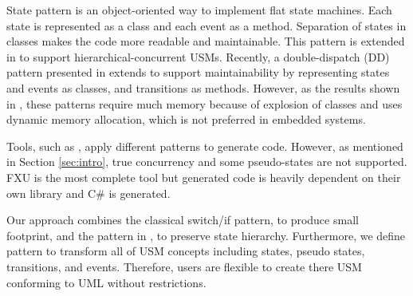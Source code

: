 State pattern \cite{Shalyto2006,Douglass1999} is an object-oriented way to implement flat state machines. Each state is represented as a class and each event as a method. %
Separation of states in classes makes the code more readable and maintainable. %
This pattern is extended in \cite{niaz_mapping_2004} to support hierarchical-concurrent USMs. 
Recently, a double-dispatch (DD) pattern presented in \cite{spinke_object-oriented_2013} extends \cite{niaz_mapping_2004} to support maintainability by %
representing states and events as classes, and transitions as methods. 
However, as the results shown in \cite{spinke_object-oriented_2013}, these patterns require much memory because of explosion of classes and uses dynamic memory allocation, which is not preferred in embedded systems.

Tools, such as \cite{ibm_rhapsody, sparxsystems_enterprise_2014}, apply different patterns to generate code. 
However, as mentioned in Section \ref{sec:intro}, true concurrency and some pseudo-states are not supported. 
FXU \cite{Pilitowski2007} is the most complete tool but generated code is heavily dependent on their own library and C\# is generated.

Our approach combines the classical switch/if pattern, to produce small footprint, and the pattern in \cite{niaz_mapping_2004}, to preserve state hierarchy.
Furthermore, we define pattern to transform all of USM concepts including states, pseudo states, transitions, and events.
Therefore, users are flexible to create there USM conforming to UML without restrictions.





